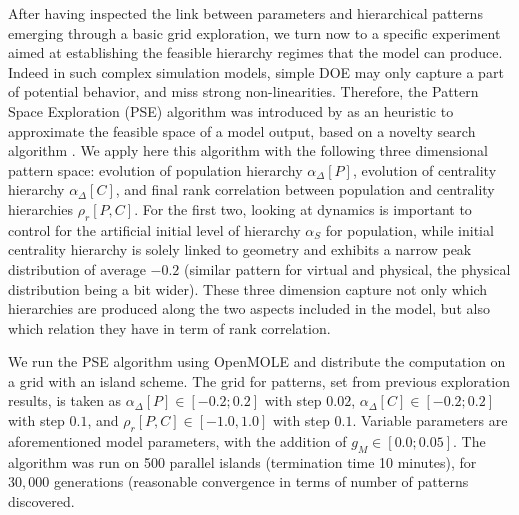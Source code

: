 \documentclass[11pt]{article}
\begin{document}
After having inspected the link between parameters and hierarchical patterns emerging through a basic grid exploration, we turn now to a specific experiment aimed at establishing the feasible hierarchy regimes that the model can produce. Indeed in such complex simulation models, simple DOE may only capture a part of potential behavior, and miss strong non-linearities. Therefore, the Pattern Space Exploration (PSE) algorithm was introduced by \cite{cherel2015beyond} as an heuristic to approximate the feasible space of a model output, based on a novelty search algorithm \citep{lehman2008exploiting}. We apply here this algorithm with the following three dimensional pattern space: evolution of population hierarchy $\alpha_{\Delta}\left[P\right]$, evolution of centrality hierarchy $\alpha_{\Delta}\left[C\right]$, and final rank correlation between population and centrality hierarchies $\rho_r\left[P,C\right]$. For the first two, looking at dynamics is important to control for the artificial initial level of hierarchy $\alpha_S$ for population, while initial centrality hierarchy is solely linked to geometry and exhibits a narrow peak distribution of average $-0.2$ (similar pattern for virtual and physical, the physical distribution being a bit wider). These three dimension capture not only which hierarchies are produced along the two aspects included in the model, but also which relation they have in term of rank correlation.

We run the PSE algorithm using OpenMOLE and distribute the computation on a grid with an island scheme. The grid for patterns, set from previous exploration results, is taken as $\alpha_{\Delta}\left[P\right] \in \left[-0.2;0.2\right]$ with step $0.02$, $\alpha_{\Delta}\left[C\right] \in \left[-0.2;0.2\right]$ with step $0.1$, and $\rho_r \left[P,C\right] \in \left[-1.0,1.0\right]$ with step $0.1$. Variable parameters are aforementioned model parameters, with the addition of $g_M \in \left[0.0;0.05\right]$. The algorithm was run on 500 parallel islands (termination time 10 minutes), for $30,000$ generations (reasonable convergence in terms of number of patterns discovered.
\end{document}
